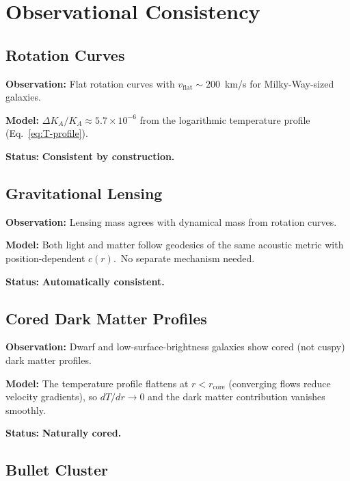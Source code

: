 \documentclass[12pt,letterpaper]{article}
\newcommand{\Ka}{K_{\!A}}
\begin{document}
\section{Observational Consistency}
\label{sec:observations}

\subsection{Rotation Curves}

\textbf{Observation:} Flat rotation curves with $v_{\mathrm{flat}} \sim
200$~km/s for Milky-Way-sized galaxies.

\textbf{Model:} $\Delta\Ka/\Ka \approx 5.7 \times 10^{-6}$ from the
logarithmic temperature profile (Eq.~\ref{eq:T-profile}).

\textbf{Status:} \textbf{Consistent by construction.}


\subsection{Gravitational Lensing}

\textbf{Observation:} Lensing mass agrees with dynamical mass from rotation
curves.

\textbf{Model:} Both light and matter follow geodesics of the same acoustic
metric with position-dependent $c(r)$.\ No separate mechanism needed.

\textbf{Status:} \textbf{Automatically consistent.}


\subsection{Cored Dark Matter Profiles}

\textbf{Observation:} Dwarf and low-surface-brightness galaxies show cored
(not cuspy) dark matter profiles.

\textbf{Model:} The temperature profile flattens at $r < r_{\mathrm{core}}$
(converging flows reduce velocity gradients), so $dT/dr \to 0$ and the dark
matter contribution vanishes smoothly.

\textbf{Status:} \textbf{Naturally cored.}


\subsection{Bullet Cluster}
\end{document}
